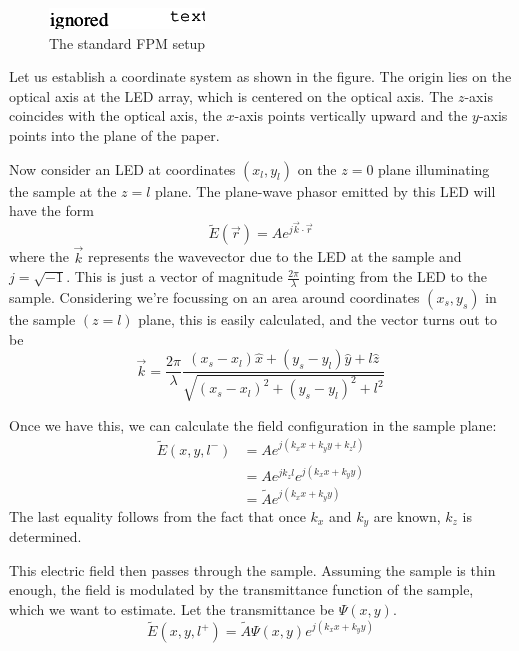 \documentclass[11pt,a4paper,journal]{IEEEtran}
\begin{document}
\begin{figure}
  \caption{The standard FPM setup}
  \centering
    \includegraphics[scale=1]{fpm_setup}
\end{figure}

Let us establish a coordinate system as shown in the figure. The origin lies on the optical axis at the LED array, which is centered on the optical axis. The $z$-axis coincides with the optical axis, the $x$-axis points vertically upward and the $y$-axis points into the plane of the paper.

Now consider an LED at coordinates $(x_l, y_l)$ on the $z=0$ plane illuminating the sample at the $z=l$ plane. The plane-wave phasor emitted by this LED will have the form
\begin{equation}
\tilde{E}(\vec{r}) = A e^{j \vec{k} \cdot \vec{r}}
\end{equation}
where the $\vec{k}$ represents the wavevector due to the LED at the sample and $j=\sqrt{-1}$. This is just a vector of magnitude $\frac{2\pi}{\lambda}$ pointing from the LED to the sample. Considering we're focussing on an area around coordinates $(x_s, y_s)$ in the sample $(z=l)$ plane, this is easily calculated, and the vector turns out to be
\begin{equation}
\vec{k} = \frac{2\pi}{\lambda} \frac{(x_s-x_l)\hat{x}+(y_s-y_l)\hat{y}+l\hat{z}}{\sqrt{(x_s-x_l)^2+(y_s-y_l)^2+l^2}}
\end{equation}

Once we have this, we can calculate the field configuration in the sample plane:
\begin{equation}
\begin{split}
\tilde{E}(x, y, l^-) & = A e^{j(k_x x + k_y y + k_z l)} \\
				   & = Ae^{jk_z l} e^{j(k_x x + k_y y)} \\
				   & = \tilde{A} e^{j(k_x x + k_y y)}
\end{split}
\end{equation}
The last equality follows from the fact that once $k_x$ and $k_y$ are known, $k_z$ is determined.

This electric field then passes through the sample. Assuming the sample is thin enough, the field is modulated by the transmittance function of the sample, which we want to estimate. Let the transmittance be $\Psi (x, y)$.
\begin{equation}
\tilde{E}(x, y, l^+) = \tilde{A} \Psi (x, y) e^{j(k_x x + k_y y)}
\end{equation}
\end{document}
